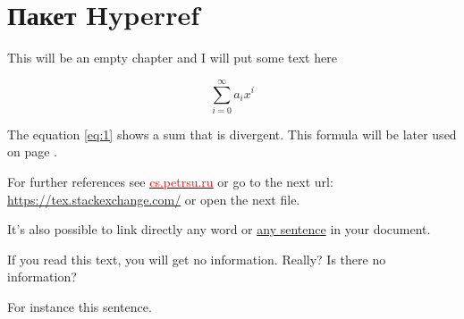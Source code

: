 \section{Пакет Hyperref}

This will be an empty chapter and I will put some text here

\begin{equation}
\label{eq:1}
\sum_{i=0}^{\infty} a_i x^i
\end{equation}

The equation \ref{eq:1} shows a sum that is divergent. This formula will be later used on page \pageref{second}.

For further references see \href{https://kappa.cs.petrsu.ru/~chistyak/documentation/}{\textcolor{red}{cs.petrsu.ru}} or go to the next url: \url{https://tex.stackexchange.com/} or open the next file.

It's also possible to link directly any word or \hyperlink{thesentence}{any sentence} in your document.

If you read this text, you will get no information.  Really?  Is there no information?

For instance \hypertarget{thesentence}{this sentence}.

\clearpage